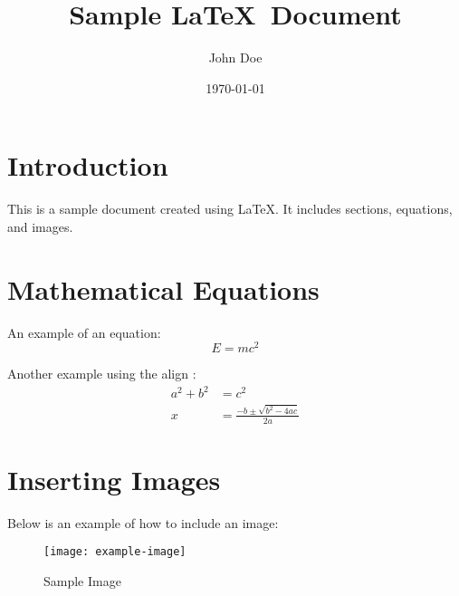 \documentclass{article}
\begin{document}
\title{Sample \LaTeX\ Document}
\author{John Doe}
\date{\today}

\maketitle

\section{Introduction}
This is a sample document created using \LaTeX. It includes sections, equations, and images.

\section{Mathematical Equations}
An example of an equation:
\begin{equation}
    E = mc^2
\end{equation}

Another example using the align :
\begin{align}
    a^2 + b^2 & = c^2                                \\
    x         & = \frac{-b \pm \sqrt{b^2 - 4ac}}{2a}
\end{align}

\section{Inserting Images}
Below is an example of how to include an image:

\begin{figure}[h]
    \centering
    \texttt{[image: example-image]}
    \caption{Sample Image}
    \label{fig:sample}
\end{figure}
\end{document}
